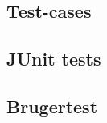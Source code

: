 \begin{flushleft}
\doublespacing
\subsection{Test-cases}
\subsection{JUnit tests}
\subsection{Brugertest}
\end{flushleft}